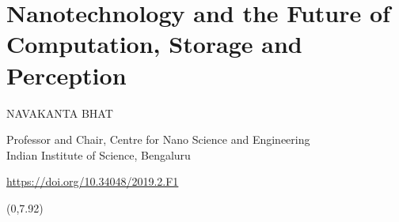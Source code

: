 \chapter{Nanotechnology and the Future of Computation, Storage and Perception}

\begin{center}
{\large\uppercase{Navakanta Bhat}}

\vskip -6pt

Professor and Chair, Centre for Nano Science and Engineering\\ Indian Institute of Science, Bengaluru
\end{center}

\vskip 1.2cm


\centerline{\url{https://doi.org/10.34048/2019.2.F1}}

\vfill


\begin{textblock}{16}(0,7.92)
\noindent{}
\end{textblock}

\newpage

